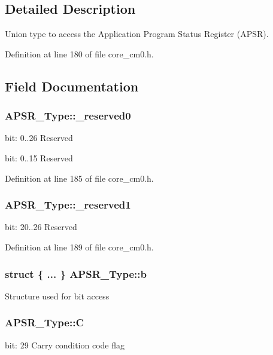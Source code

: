 \subsection{Detailed Description}
Union type to access the Application Program Status Register (A\-P\-S\-R). 

Definition at line 180 of file core\-\_\-cm0.\-h.



\subsection{Field Documentation}
\hypertarget{union_a_p_s_r___type_afbce95646fd514c10aa85ec0a33db728}{
\subsubsection[{\-\_\-reserved0}]{ A\-P\-S\-R\-\_\-\-Type\-::\-\_\-reserved0}}\label{union_a_p_s_r___type_afbce95646fd514c10aa85ec0a33db728}
bit\-: 0..26 Reserved

bit\-: 0..15 Reserved 

Definition at line 185 of file core\-\_\-cm0.\-h.

\hypertarget{union_a_p_s_r___type_ac681f266e20b3b3591b961e13633ae13}{
\subsubsection[{\-\_\-reserved1}]{ A\-P\-S\-R\-\_\-\-Type\-::\-\_\-reserved1}}\label{union_a_p_s_r___type_ac681f266e20b3b3591b961e13633ae13}
bit\-: 20..26 Reserved 

Definition at line 189 of file core\-\_\-cm0.\-h.

\hypertarget{union_a_p_s_r___type_a250681ece58cf12233f316edea344e75}{
\subsubsection[{b}]{\setlength{\rightskip}{0pt plus 5cm}struct \{ ... \}   A\-P\-S\-R\-\_\-\-Type\-::b}}\label{union_a_p_s_r___type_a250681ece58cf12233f316edea344e75}
Structure used for bit access \hypertarget{union_a_p_s_r___type_a86e2c5b891ecef1ab55b1edac0da79a6}{
\subsubsection[{C}]{ A\-P\-S\-R\-\_\-\-Type\-::\-C}}\label{union_a_p_s_r___type_a86e2c5b891ecef1ab55b1edac0da79a6}
bit\-: 29 Carry condition code flag 

